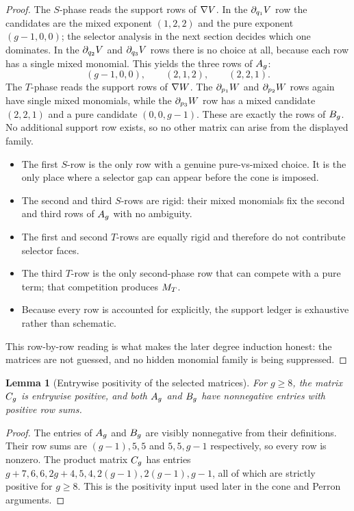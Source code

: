 \documentclass[11pt]{article}
\newtheorem{lemma}[theorem]{Lemma}
\theoremstyle{remark}
\numberwithin{equation}{section}
\begin{document}
\begin{proof}
The \(S\)-phase reads the support rows of \(\nabla V\).  In the
\(\partial_{q_1}V\) row the candidates are the mixed exponent
\((1,2,2)\) and the pure exponent \((g-1,0,0)\); the selector analysis in the
next section decides which one dominates.  In the \(\partial_{q_2}V\) and
\(\partial_{q_3}V\) rows there is no choice at all, because each row has a
single mixed monomial.  This yields the three rows of \(A_g\):
\[
(g-1,0,0),\qquad (2,1,2),\qquad (2,2,1).
\]
The \(T\)-phase reads the support rows of \(\nabla W\).  The
\(\partial_{p_1}W\) and \(\partial_{p_2}W\) rows again have single
mixed monomials, while the \(\partial_{p_3}W\) row has a mixed candidate
\((2,2,1)\) and a pure candidate \((0,0,g-1)\).  These are exactly the rows of
\(B_g\).  No additional support row exists, so no other matrix can arise from
the displayed family.
\begin{itemize}
\item The first \(S\)-row is the only row with a genuine pure-vs-mixed choice.
  It is the only place where a selector gap can appear before the cone is
  imposed.
\item The second and third \(S\)-rows are rigid: their mixed monomials fix the
  second and third rows of \(A_g\) with no ambiguity.
\item The first and second \(T\)-rows are equally rigid and therefore do not
  contribute selector faces.
\item The third \(T\)-row is the only second-phase row that can compete with a
  pure term; that competition produces \(M_T\).
\item Because every row is accounted for explicitly, the support ledger is
  exhaustive rather than schematic.
\end{itemize}
\noindent
This row-by-row reading is what makes the later degree induction honest: the
matrices are not guessed, and no hidden monomial family is being suppressed.
\end{proof}

\begin{lemma}[Entrywise positivity of the selected matrices]\label{lem:matrix-positive}
For \(g\geq 8\), the matrix \(C_g\) is entrywise positive, and both \(A_g\)
and \(B_g\) have nonnegative entries with positive row sums.
\end{lemma}

\begin{proof}
The entries of \(A_g\) and \(B_g\) are visibly nonnegative from their
definitions.  Their row sums are \((g-1), 5, 5\) and \(5, 5, g-1\)
respectively, so every row is nonzero.  The product matrix \(C_g\) has entries
\(g+7,6,6,2g+4,5,4,2(g-1),2(g-1),g-1\), all of which are strictly positive for
\(g\geq 8\).  This is the positivity input used later in the cone and Perron
arguments.
\end{proof}
\end{document}
